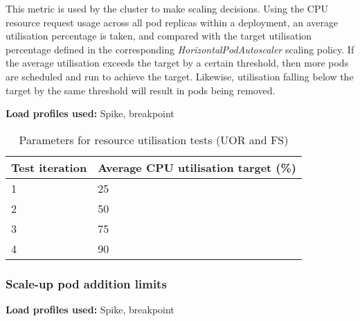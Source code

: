 This metric is used by the cluster to make scaling decisions. Using the CPU resource request usage across all pod replicas within a deployment, an average utilisation percentage is taken, and compared with the target utilisation percentage defined in the corresponding \textit{HorizontalPodAutoscaler} scaling policy. If the average utilisation exceeds the target by a certain threshold, then more pods are scheduled and run to achieve the target. Likewise, utilisation falling below the target by the same threshold will result in pods being removed.

\noindent\textbf{Load profiles used:} Spike, breakpoint

\begin{table}[h]
    \centering
    \begin{tabularx}{\textwidth}{|X|X|}
        \hline
        \textbf{Test iteration} & \textbf{Average CPU utilisation target (\%)}  \\ \hline
        1 & 25 \\ \hline
        2 & 50 \\ \hline
        3 & 75 \\ \hline
        4 & 90 \\ \hline
    \end{tabularx}
    \caption{Parameters for resource utilisation tests (UOR and FS)}
    \label{table:test-resource-utilisation}
\end{table}

\subsubsection{Scale-up pod addition limits}

\noindent\textbf{Load profiles used:} Spike, breakpoint